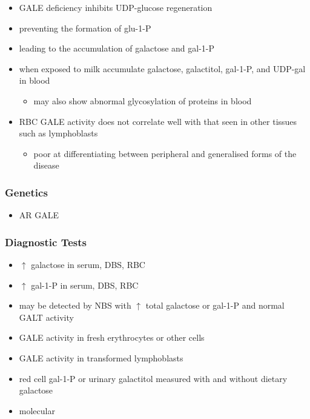 \documentclass[12pt]{scrartcl}
\begin{document}

\begin{itemize}
\item GALE deficiency inhibits UDP-glucose regeneration
\item preventing the formation of glu-1-P
\item leading to the accumulation of galactose and gal-1-P
\end{itemize}
\begin{itemize}
\item when exposed to milk accumulate galactose, galactitol, gal-1-P, and
UDP-gal in blood
\begin{itemize}
\item may also show abnormal glycosylation of proteins in blood
\end{itemize}
\item RBC GALE activity does not correlate well with that seen in
other tissues such as lymphoblasts
\begin{itemize}
\item poor at differentiating between peripheral and generalised forms
of the disease
\end{itemize}
\end{itemize}

\subsubsection{Genetics}
\label{sec:org705b3c9}
\begin{itemize}
\item AR GALE
\end{itemize}

\subsubsection{Diagnostic Tests}
\label{sec:org5541c07}
\begin{itemize}
\item \(\uparrow\) galactose in serum, DBS, RBC
\item \(\uparrow\) gal-1-P in serum, DBS, RBC
\item may be detected by NBS with \(\uparrow\) total galactose or gal-1-P and normal GALT activity
\item GALE activity in fresh erythrocytes or other cells
\item GALE activity in transformed lymphoblasts
\item red cell gal-1-P or urinary galactitol measured with and without dietary galactose
\item molecular
\end{itemize}
\end{document}
